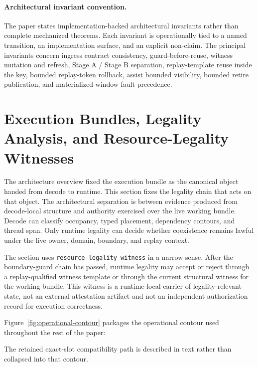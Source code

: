 \documentclass[twocolumn]{article}
\begin{document}
\paragraph{Architectural invariant convention.}
The paper states implementation-backed architectural invariants rather than complete mechanized theorems. Each invariant is operationally tied to a named transition, an implementation surface, and an explicit non-claim. The principal invariants concern ingress contract consistency, guard-before-reuse, witness mutation and refresh, Stage A / Stage B separation, replay-template reuse inside the key, bounded replay-token rollback, assist bounded visibility, bounded retire publication, and materialized-window fault precedence.


\section{Execution Bundles, Legality Analysis, and Resource-Legality Witnesses}

The architecture overview fixed the execution bundle as the canonical object handed from decode to runtime. This section fixes the legality chain that acts on that object. The architectural separation is between evidence produced from decode-local structure and authority exercised over the live working bundle. Decode can classify occupancy, typed placement, dependency contours, and thread span. Only runtime legality can decide whether coexistence remains lawful under the live owner, domain, boundary, and replay context.

The section uses \texttt{resource-legality witness} in a narrow sense. After the boundary-guard chain has passed, runtime legality may accept or reject through a replay-qualified witness template or through the current structural witness for the working bundle. This witness is a runtime-local carrier of legality-relevant state, not an external attestation artifact and not an independent authorization record for execution correctness.

Figure~\ref{fig:operational-contour} packages the operational contour used throughout the rest of the paper:



The retained exact-slot compatibility path is described in text rather than collapsed into that contour.
\end{document}
